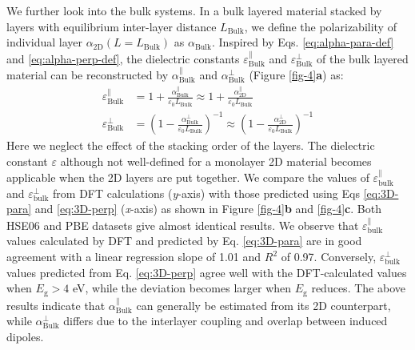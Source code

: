 We further look into the bulk systems. In a bulk layered material stacked by layers with equilibrium
inter-layer distance $L_{\mathrm{Bulk}}$, we define the polarizability
of individual layer $\alpha_{\mathrm{2D}}(L=L_{\mathrm{Bulk}})$ as
$\alpha_{\mathrm{Bulk}}$. Inspired by Eqs. \ref{eq:alpha-para-def} and
\ref{eq:alpha-perp-def}, the dielectric constants
$\varepsilon^{\parallel}_{\mathrm{Bulk}}$ and
$\varepsilon^{\perp}_{\mathrm{Bulk}}$ of the bulk layered material can
be reconstructed by $\alpha_{\mathrm{Bulk}}^{\parallel}$ and
$\alpha_{\mathrm{Bulk}}^{\perp}$ (Figure \ref{fig-4}{\textbf a}) as:
%
%
\begin{subequations}
\begin{align}
  \label{eq:3D-para}
  \varepsilon^{\parallel}_{\mathrm{Bulk}}
  &= 1 + \frac{\alpha_{\mathrm{Bulk}}^{\parallel}}{\varepsilon_{0} L_{\mathrm{Bulk}}}
  \approx 1 + \frac{\alpha_{\mathrm{2D}}^{\parallel}}{\varepsilon_{0} L_{\mathrm{Bulk}}} \\
  \label{eq:3D-perp}
  \varepsilon^{\perp}_{\mathrm{Bulk}}
  &= \left(1 - \frac{\alpha_{\mathrm{Bulk}}^{\perp}}{\varepsilon_{0} L_{\mathrm{Bulk}}}\right)^{-1}
  \approx \left(1 - \frac{\alpha_{\mathrm{2D}}^{\perp}}{\varepsilon_{0} L_{\mathrm{Bulk}}}\right)^{-1}
\end{align}
\end{subequations}
%
%
Here we neglect the effect of the stacking order of the layers.  The
dielectric constant $\varepsilon$ although not well-defined for a
monolayer 2D material becomes applicable when the 2D layers are put
together.
%
We compare the values of
$\varepsilon_{\mathrm{bulk}}^{\parallel}$ and
$\varepsilon_{\mathrm{bulk}}^{\perp}$ from DFT calculations (\textit{y}-axis)
with those predicted using Eqs \ref{eq:3D-para} and \ref{eq:3D-perp}
(\textit{x}-axis) as shown in Figure \ref{fig-4}{\textbf b} and \ref{fig-4}{\textbf c}. 
Both HSE06 and PBE datasets give almost identical results.  
%
We observe that
$\varepsilon_{\mathrm{bulk}}^{\parallel}$ values calculated by DFT and
predicted by Eq. \ref{eq:3D-para} are in good agreement with a linear
regression slope of 1.01 and $R^2$ of 0.97. Conversely,
$\varepsilon_{\mathrm{bulk}}^{\perp}$ values predicted from
Eq. \ref{eq:3D-perp} agree well with the DFT-calculated values when
$E_{\mathrm{g}}>4$ eV, while the deviation becomes larger when
$E_{\mathrm{g}}$ reduces. The above results indicate that
$\alpha^{\parallel}_{\mathrm{Bulk}}$ can generally be estimated from
its 2D counterpart, while $\alpha^{\perp}_{\mathrm{Bulk}}$ differs due
to the interlayer coupling and overlap between induced
dipoles\cite{Andersen_2015_dielec_vdWH,Laturia_2018}. 

